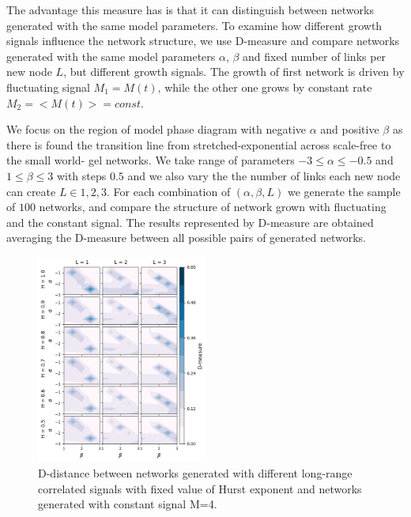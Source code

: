 The advantage this measure has is that it can distinguish between networks generated with the same model parameters. To examine how different growth signals influence the network structure, we use D-measure and compare networks generated with the same model parameters $\alpha$, $\beta$ and fixed number of links per new node $L$, but different growth signals. The growth of first network is driven by fluctuating signal $M_1 = {M(t)}$, while the other one grows by constant rate $M_2=<M(t)> = const$. 

We focus on the region of model phase diagram with negative $\alpha$ and positive $\beta$ as there is found the transition line from stretched-exponential across scale-free to the small world- gel networks. We take range of parameters  $-3\leq\alpha\leq-0.5$ and $1\leq\beta\leq3$ with steps $0.5$ and we also vary the the number of links each new node can create $L\in{1, 2, 3}$. For each combination of $(\alpha, \beta, L)$ we generate the sample of $100$ networks, and compare the structure of network grown with fluctuating and the constant signal. The results represented by D-measure are obtained averaging the D-measure between all possible pairs of generated networks.     

\begin{figure}[h!]
	\centering
	\includegraphics[width=0.5\textwidth]{Figures/Ddist_M4_w10.5_w20.5.png}
	\caption{D-distance between networks generated with different long-range correlated signals with fixed value of Hurst exponent and networks generated with constant signal M=4.}
	\label{fig:Ddist_m}
\end{figure}


